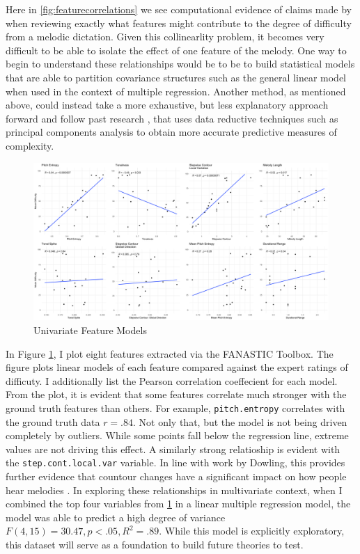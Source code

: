 \documentclass[12pt,]{book}
\begin{document}
Here in \ref{fig:featurecorrelations} we see computational evidence of claims made by \citet{taylorStrategiesMemoryShort1983} when reviewing exactly what features might contribute to the degree of difficulty from a melodic dictation.
Given this collinearlity problem, it becomes very difficult to be able to isolate the effect of one feature of the melody.
One way to begin to understand these relationships would be to be to build statistical models that are able to partition covariance structures such as the general linear model when used in the context of multiple regression.
Another method, as mentioned above, could instead take a more exhaustive, but less explanatory approach forward and follow past research \citep{bakerPerceptionLeitmotivesRichard2017, harrisonModellingMelodicDiscrimination2016}, that uses data reductive techniques such as principal components analysis to obtain more accurate predictive measures of complexity.

\begin{figure}

{\centering \includegraphics[width=1\linewidth]{img/univariate_cow} 

}

\caption{Univariate Feature Models}\label{fig:univariatecow}
\end{figure}

In Figure \ref{fig:univariatecow}, I plot eight features extracted via the FANASTIC Toolbox.
The figure plots linear models of each feature compared against the expert ratings of difficuty.
I additionally list the Pearson correlation coeffecient for each model.
From the plot, it is evident that some features correlate much stronger with the ground truth features than others.
For example, \texttt{pitch.entropy} correlates with the ground truth data \(r = .84\).
Not only that, but the model is not being driven completely by outliers.
While some points fall below the regression line, extreme values are not driving this effect.
A similarly strong relatioship is evident with the \texttt{step.cont.local.var} variable.
In line with work by Dowling, this provides further evidence that countour changes have a significant impact on how people hear melodies \citep{dowlingScaleContourTwo1978}.
In exploring these relationships in multivariate context, when I combined the top four variables from \ref{fig:univariatecow} in a linear multiple regression model, the model was able to predict a high degree of variance \(F(4,15) = 30.47, p < .05, R^2 = .89\).
While this model is explicitly exploratory, this dataset will serve as a foundation to build future theories to test.
\end{document}

